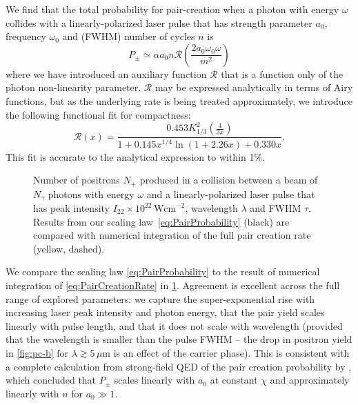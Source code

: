 \documentclass[reprint,superscriptaddress,amsmath,amssymb,aps,pra]{revtex4-1}
\newcommand{\micron}{{\mu\mathrm{m}}}
\newcommand{\Wcm}{\mathrm{Wcm}}
\newcommand{\aux}{\mathcal{R}}
\begin{document}
We find that the total probability for pair-creation when a photon with energy
$\omega$ collides with a linearly-polarized laser pulse that has strength parameter
$a_0$, frequency $\omega_0$ and (FWHM) number of cycles $n$ is
	\begin{equation}
	P_\pm \simeq
		\alpha a_0 n \aux
		\!\left(\frac{2 a_0 \omega_0 \omega}{m^2}\right)
	\label{eq:PairProbability}
	\end{equation}
where we have introduced an auxiliary function $\aux$ that is a function
only of the photon non-linearity parameter. $\aux$ may be expressed
analytically in terms of Airy functions, but as the underlying rate is
being treated approximately, we introduce the following functional fit for
compactness:
	\begin{equation}
	\aux(x) =
		\frac{0.453 K^2_{1/3}\!\left(\frac{4}{3 x}\right)}{1 + 0.145 x^{1/4} \ln(1 + 2.26 x) + 0.330 x}.
	\label{eq:K}
	\end{equation}
This fit is accurate to the analytical expression to within 1\%.

	\begin{figure}
	\subfloat[]{\label{fig:pc-b}}
	\subfloat[]{}
	\subfloat[]{}
	\caption[Positron yields]
			{Number of positrons $N_+$ produced in a collision between a beam of
			$N_\gamma$ photons with energy $\omega$ and a linearly-polarized laser pulse
			that has peak intensity $I_{22}\times10^{22}\,\Wcm^{-2}$, wavelength $\lambda$
			and FWHM $\tau$. Results from our scaling law~\cref{eq:PairProbability}
			(black) are compared with numerical integration of the full pair creation
			rate (yellow, dashed).}
	\label{fig:PhotonCollisions}
	\end{figure}

We compare the scaling law \cref{eq:PairProbability} to the result of
numerical integration of \cref{eq:PairCreationRate} in \cref{fig:PhotonCollisions}.
Agreement is excellent across the full range of explored parameters: we capture the
super-exponential rise with increasing laser peak intensity and photon energy,
that the pair yield scales linearly with pulse length, and that it does not scale with
wavelength (provided that the wavelength is smaller than the pulse FWHM -- the drop
in positron yield in \cref{fig:pc-b} for $\lambda \gtrsim 5\,\micron$ is an effect
of the carrier phase). This is consistent with a complete calculation from
strong-field QED of the pair creation probability by \citet{Meuren}, which
concluded that $P_\pm$ scales linearly with $a_0$ at constant $\chi$ and
approximately linearly with $n$ for $a_0 \gg 1$.
\end{document}
